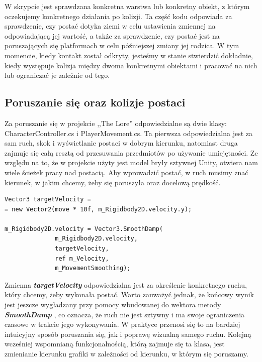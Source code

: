 \documentclass[oneside,polski,logo]{amuthesis}
\begin{document}
W skrypcie jest sprawdzana konkretna warstwa lub konkretny obiekt, z którym oczekujemy konkretnego działania po kolizji.
Ta część kodu odpowiada za sprawdzenie, czy postać dotyka ziemi w celu ustawienia zmiennej na odpowiadającą jej wartość, a także za sprawdzenie, czy postać jest na poruszających się platformach w celu późniejszej zmiany jej rodzica.
W tym momencie, kiedy kontakt został odkryty, jesteśmy w stanie stwierdzić dokładnie, kiedy występuje kolizja między dwoma konkretnymi obiektami i pracować na nich lub ograniczać je zależnie od tego.

\subsection{Poruszanie się oraz kolizje postaci}
Za poruszanie się w projekcie ,,The Lore'' odpowiedzialne są dwie klasy: CharacterController.cs i PlayerMovement.cs. Ta pierwsza odpowiedzialna jest za sam ruch, skok i wyświetlanie postaci w dobrym kierunku, natomiast druga zajmuje się całą resztą od przesuwania przedmiotów po używanie umiejętności. Ze względu na to, że w projekcie użyty jest model bryły sztywnej Unity, otwiera nam wiele ścieżek pracy nad postacią. Aby wprowadzić postać, w ruch musimy znać kierunek, w jakim chcemy, żeby się poruszyła oraz docelową prędkość.


\begin{lstlisting}[breaklines=true,
language={[Sharp]C},
rulecolor=\color{blue!80!black},
caption={Fragment klasy \texttt{CharacterController.cs}}
]
Vector3 targetVelocity =
= new Vector2(move * 10f, m_Rigidbody2D.velocity.y);

m_Rigidbody2D.velocity = Vector3.SmoothDamp(
              m_Rigidbody2D.velocity, 
              targetVelocity, 
              ref m_Velocity, 
              m_MovementSmoothing);
\end{lstlisting}

Zmienna \textbf{\textit{targetVelocity}} odpowiedzialna jest za określenie konkretnego ruchu, który chcemy, żeby wykonała postać. Warto zauważyć jednak, że końcowy wynik jest jeszcze wygładzany przy pomocy wbudowanej do wektora metody \textbf{\textit{SmoothDamp}} \cite{physics2}, co oznacza, że ruch nie jest sztywny i ma swoje ograniczenia czasowe w trakcie jego wykonywania. W praktyce przenosi się to na bardziej intuicyjny sposób poruszania się, jak i poprawę wizualną samego ruchu.
Kolejną wcześniej wspomnianą funkcjonalnością, którą zajmuje się ta klasa, jest zmienianie kierunku grafiki w zależności od kierunku, w którym się poruszamy.
\end{document}
